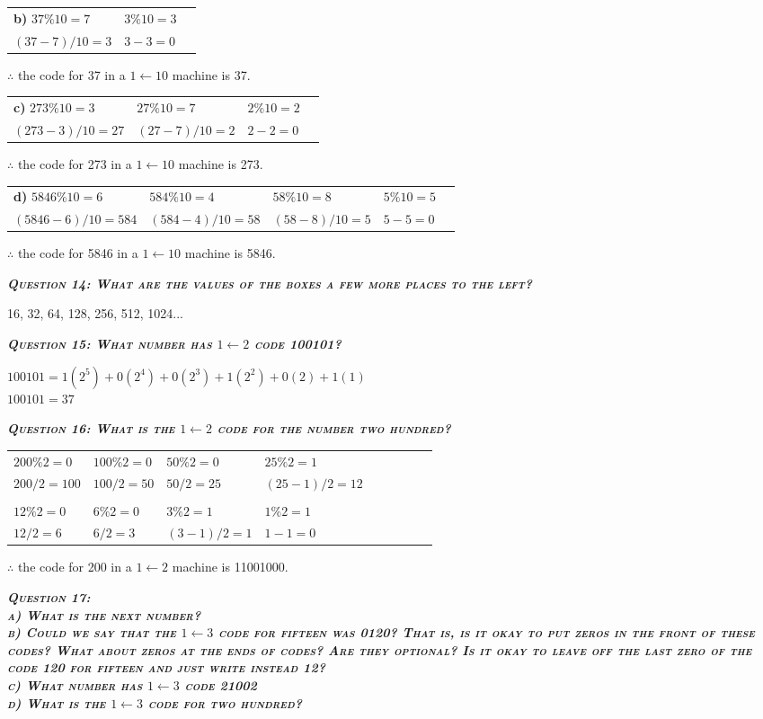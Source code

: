 \documentclass{article}
\begin{document}
\begin{tabular}{l l l}
    \textbf{b)} $37\%10=7$ & $3\%10=3$
    & \\
    $(37-7)/10=3$ & $3-3=0$
\end{tabular}
$\therefore$ the code for 37 in a $1 \leftarrow 10$ machine is 37.

\begin{tabular}{l l l l}
    \textbf{c)} $273\%10=3$ & $27\%10=7$ & $2\%10=2$
    & \\
    $(273-3)/10=27$ & $(27-7)/10=2$ & $2-2=0$
\end{tabular}

$\therefore$ the code for 273 in a $1 \leftarrow 10$ machine is 273.

\begin{tabular}{l l l l l}
    \textbf{d)} $5846\%10=6$ & $584\%10=4$ & $58\%10=8$ & $5\%10=5$
    & \\
    $(5846-6)/10=584$ & $(584-4)/10=58$ & $(58-8)/10=5$ & $5-5=0$
\end{tabular}

$\therefore$ the code for 5846 in a $1 \leftarrow 10$ machine is 5846.

\textbf{\emph{\textsc{Question 14: What are the values of the boxes a few more places to the left?}}}

16, 32, 64, 128, 256, 512, 1024...

\textbf{\emph{\textsc{Question 15: What number has $1 \leftarrow 2$ code 100101?}}}

$100101=1(2^5)+0(2^4)+0(2^3)+1(2^2)+0(2)+1(1)$ \\
$100101=37$

\textbf{\emph{\textsc{Question 16: What is the $1 \leftarrow 2$ code for the number two hundred?}}}


\begin{tabular}{l l l l l l l l l}
    $200\%2=0$ & $100\%2=0$ & $50\%2=0$ & $25\%2=1$ 
    & \\
    $200/2=100$ & $100/2=50$ & $50/2=25$ & $(25-1)/2=12$
    & \\ \\
    $12\%2=0$ & $6\%2=0$ & $3\%2=1$ & $1\%2=1$ 
    & \\
    $12/2=6$ & $6/2=3$ & $(3-1)/2=1$ & $1-1=0$
\end{tabular}

$\therefore$ the code for 200 in a $1 \leftarrow 2$ machine is 11001000.

\newpage

\textbf{\emph{\textsc{Question 17: \\
a) What is the next number? \\
b) Could we say that the $1 \leftarrow 3$ code for fifteen was 0120? That is, is it okay to put zeros in the front of these codes? What about zeros at the ends of codes? Are they optional? Is it okay to leave off the last zero of the code 120 for fifteen and just write instead 12? \\
c) What number has $1 \leftarrow 3$ code 21002 \\
d) What is the $1 \leftarrow 3$ code for two hundred?}}}
\end{document}
